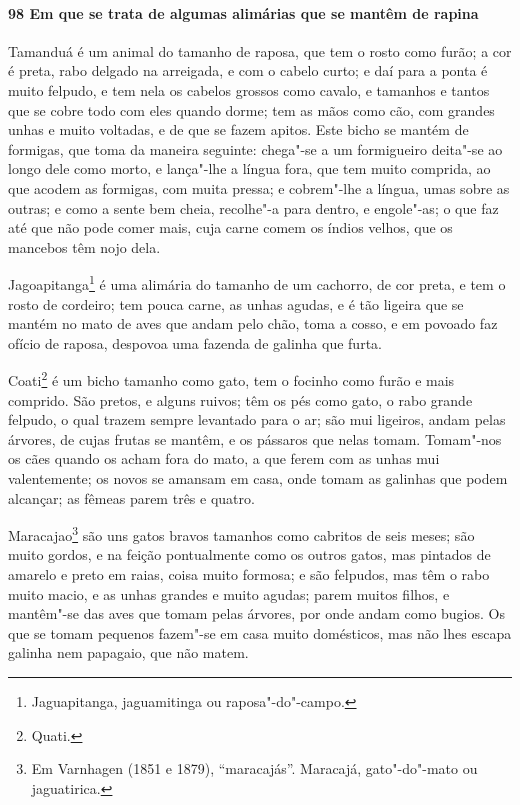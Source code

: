 \paragraph{98 Em que se trata de algumas alimárias que se mantêm de rapina}

Tamanduá é um animal do tamanho de raposa, que tem o rosto como furão; a cor é preta, rabo
delgado na arreigada, e com o cabelo curto; e daí para a ponta é muito felpudo, e tem nela
os cabelos grossos como cavalo, e tamanhos e tantos que se cobre todo com eles quando
dorme; tem as mãos como cão, com grandes unhas e muito voltadas, e de que se fazem apitos.
Este bicho se mantém de formigas, que toma da maneira seguinte: chega"-se a um formigueiro
deita"-se ao longo dele como morto, e lança"-lhe a língua fora, que tem muito comprida, ao
que acodem as formigas, com muita pressa; e cobrem"-lhe a língua, umas sobre as outras; e
como a sente bem cheia, recolhe"-a para dentro, e engole"-as; o que faz até que não pode
comer mais, cuja carne comem os índios velhos, que os mancebos têm nojo dela.

Jagoapitanga\footnote{ Jaguapitanga, jaguamitinga ou raposa"-do"-campo.} é uma alimária do
tamanho de um cachorro, de cor preta, e tem o rosto de cordeiro; tem pouca carne, as unhas
agudas, e é tão ligeira que se mantém no mato de aves que andam pelo chão, toma a cosso, e
em povoado faz ofício de raposa, despovoa uma fazenda de galinha que furta.

Coati\footnote{ Quati.} é um bicho tamanho como gato, tem o focinho como furão e mais
comprido. São pretos, e alguns ruivos; têm os pés como gato, o rabo grande felpudo, o qual
trazem sempre levantado para o ar; são mui ligeiros, andam pelas árvores, de cujas frutas
se mantêm, e os pássaros que nelas tomam. Tomam"-nos os cães quando os acham fora do mato,
a que ferem com as unhas mui valentemente; os novos se amansam em casa, onde tomam as
galinhas que podem alcançar; as fêmeas parem três e quatro.

Maracajao\footnote{ Em Varnhagen (1851 e 1879), ``maracajás''. Maracajá, gato"-do"-mato ou
jaguatirica.} são uns gatos bravos tamanhos como cabritos de seis meses; são muito gordos,
e na feição pontualmente como os outros gatos, mas pintados de amarelo e preto em raias,
coisa muito formosa; e são felpudos, mas têm o rabo muito macio, e as unhas grandes e
muito agudas; parem muitos filhos, e mantêm"-se das aves que tomam pelas árvores, por onde
andam como bugios. Os que se tomam pequenos fazem"-se em casa muito domésticos, mas não
lhes escapa galinha nem papagaio, que não matem.


